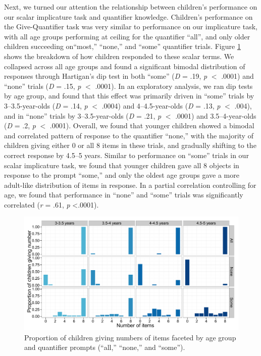 \documentclass[man]{apa2}
\begin{document}
Next, we turned our attention the relationship between children's performance on our scalar implicature task and quantifier knowledge. Children's performance on the Give-Quantifier task was very similar to performance on our implicature task, with all age groups performing at ceiling for the quantifier ``all'', and only older children succeeding on``most,'' ``none,'' and ``some'' quantifier trials. Figure \ref{fig:GQ_spread} shows the breakdown of how children responded to these scalar terms. We collapsed across all age groups and found a significant bimodal distribution of responses through Hartigan's dip test in both ``some'' (\emph{D} = .19, \emph{p} $<$ .0001) and ``none'' trials (\emph{D} = .15, \emph{p} $<$ .0001). In an exploratory analysis, we ran dip tests by age group, and found that this effect was primarily driven in ``some'' trials by 3--3.5-year-olds (\emph{D} = .14, \emph{p} $<$ .0004) and 4--4.5-year-olds (\emph{D} = .13, \emph{p} $<$ .004), and in ``none'' trials by 3--3.5-year-olds (\emph{D} = .21, \emph{p} $<$ .0001) and 3.5--4-year-olds (\emph{D} = .2, \emph{p} $<$ .0001). Overall, we found that younger children showed a bimodal and correlated pattern of response to the quantifier ``none,'' with the majority of children giving either 0 or all 8 items in these trials, and gradually shifting to the correct response by 4.5--5 years. Similar to performance on ``some'' trials in our scalar implicature task, we found that younger children gave all 8 objects in response to the prompt ``some,'' and only the oldest age groups gave a more adult-like distribution of items in response. In a partial correlation controlling for age, we found that performance in ``none'' and ``some'' trials was significantly correlated (\textit{r} = .61, \textit{p} \textless .0001). 

\begin{figure} 
 \begin{center} 
  \includegraphics[scale=.5]{figures/exp3_GQspread.pdf} 
  \caption{\label{fig:GQ_spread} Proportion of children giving numbers of items faceted by age group and quantifier prompts (``all,'' ``none,'' and ``some'').} 
 \end{center} 
\end{figure}
\end{document}
